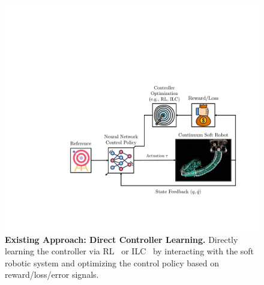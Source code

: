 \begin{figure}[ht]
    \centering
    \includegraphics[width=0.75\linewidth]{introduction/figures/controller_learning_v1_cropped.pdf}
    \caption{\textbf{Existing Approach: Direct Controller Learning.} 
    Directly learning the controller via \gls{RL}~\citep{morimoto2021model, jitosho2023reinforcement, alessi2024pushing} or \gls{ILC}~\citep{hofer2019iterative, pierallini2023provably} by interacting with the soft robotic system and optimizing the control policy based on reward/loss/error signals.
    }
    \label{fig:introduction:direct_controller_learning}
\end{figure}

